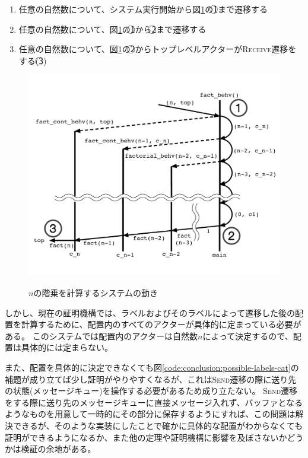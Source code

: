 
\begin{enumerate}
\item 任意の自然数について、システム実行開始から図\ref{img:conclusion:fact}の\textcircled{\scriptsize 1}まで遷移する
\item 任意の自然数について、図\ref{img:conclusion:fact}の\textcircled{\scriptsize 1}から\textcircled{\scriptsize 2}まで遷移する
\item 任意の自然数について、図\ref{img:conclusion:fact}の\textcircled{\scriptsize 2}からトップレベルアクターが\textsc{Receive}遷移をする(\textcircled{\scriptsize 3})
\end{enumerate}

\begin{figure}[tp]
  \includegraphics[width=16cm]{./img/conclusion/fact_n.pdf}
  \label{img:conclusion:fact}
  \caption{$n$の階乗を計算するシステムの動き}
\end{figure}

しかし、現在の証明機構では、ラベルおよびそのラベルによって遷移した後の配置を計算するために、配置内のすべてのアクターが具体的に定まっている必要がある。
このシステムでは配置内のアクターは自然数$n$によって決定するので、配置は具体的には定まらない。

また、配置を具体的に決定できなくても図\ref{code:conclusion:possible-labels-cat}の補題が成り立てば少し証明がやりやすくなるが、これは\textsc{Send}遷移の際に送り先の状態(メッセージキュー)を操作する必要があるため成り立たない。
\textsc{Send}遷移をする際に送り先のメッセージキューに直接メッセージ入れず、バッファとなるようなものを用意して一時的にその部分に保存するようにすれば、この問題は解決できるが、そのような実装にしたことで確かに具体的な配置がわからなくても証明ができるようになるか、また他の定理や証明機構に影響を及ぼさないかどうかは検証の余地がある。


